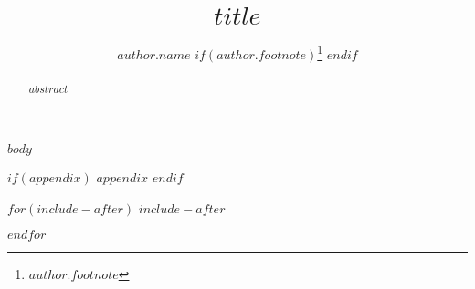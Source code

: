 \documentclass[$format$ ,$hyphenation$ $if(authorcolumns)$ ,authorcolumns $endif$ $if(cleveref)$,cleveref$endif$ $if(autoref)$,autoref$endif$ $if(thm-restate)$,thm-restate$endif$ $if(anonymous)$,anonymous$endif$ $if(numberwithinsect)$,numberwithinsect$endif$ ]{lipics-v2019}
\title{$title$}
\author{$author.name$ $if(author.footnote)$\footnote{$author.footnote$} $endif$}{$author.affiliation$}{$author.email$}{$author.orcid$}{$if(author.funding)$ $author.funding$ $endif$}
\begin{document}
\maketitle

\begin{abstract}
$abstract$
\end{abstract}

$body$





$if(appendix)$
\appendix
$appendix$
$endif$

$for(include-after)$
$include-after$

$endfor$
\end{document}
